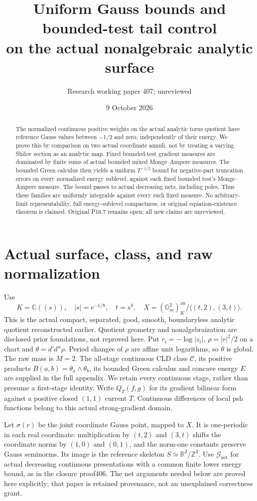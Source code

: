 \documentclass[11pt]{article}
\title{Uniform Gauss bounds and bounded-test tail control\\on the actual nonalgebraic analytic surface}
\author{Research working paper 407; unreviewed}
\date{9 October 2026}
\newcommand{\DD}{d'd''}
\newcommand{\C}{\mathcal C}
\newcommand{\GN}{\mathcal G_{\mathrm{net}}}
\newcommand{\RR}{\mathbb R}
\theoremstyle{remark}\newtheorem{remark}[theorem]{Remark}
\begin{document}
\maketitle
\begin{abstract}
The normalized continuous positive weights on the actual analytic
torus quotient have reference Gauss values between $-1/2$ and zero,
independently of their energy. We prove this by comparison on two
actual coordinate annuli, not by treating a varying Shilov section
as an analytic map. Fixed bounded-test gradient measures are
dominated by finite sums of actual bounded mixed Monge--Ampere
measures. The bounded Green calculus then yields a uniform
$T^{-1/2}$ bound for negative-part truncation errors on every
normalized energy sublevel, against each fixed bounded test's
Monge--Ampere measure. The bound passes to actual decreasing nets,
including poles. Thus these families are uniformly integrable
against every such fixed measure. No arbitrary-limit
representability, full energy-sublevel compactness, or original
equation-existence theorem is claimed. Original P16.7 remains open;
all new claims are unreviewed.
\end{abstract}

\section{Actual surface, class, and raw normalization}
Use
\[
 K=\mathbb C((s)),\quad |s|=e^{-1/8},\quad t=s^8,
 \quad X=(\mathbb G_m^2)^{\mathrm{an}}_K/
              \langle(t,2),(3,t)\rangle.
\]
This is the actual compact, separated, good, smooth, boundaryless
analytic quotient reconstructed earlier. Quotient geometry and
nonalgebraization are disclosed prior foundations, not reproved
here. Put $r_i=-\log|z_i|$, $\rho=|r|^2/2$ on a chart and
$\theta=\DD\rho$. Period changes of $\rho$ are affine unit
logarithms, so $\theta$ is global. The raw mass is $M=2$.
The all-stage continuous CLD class $\C$, its positive products
$B(a,b)=\theta_a\wedge\theta_b$, its bounded Green calculus and
concave energy $E$ are supplied in the full appendix. We retain
every continuous stage, rather than presume a first-stage identity.
Write $Q_T(f,g)$ for its gradient bilinear form against a positive
closed $(1,1)$ current $T$. Continuous differences of local psh
functions belong to this actual strong-gradient domain.

Let $\sigma(r)$ be the joint coordinate Gauss point, mapped to
$X$. It is one-periodic in each real coordinate: multiplication
by $(t,2)$ and $(3,t)$ shifts the coordinate norms by $(1,0)$ and
$(0,1)$, and the norm-one constants preserve Gauss seminorms.
Its image is the reference skeleton $S\simeq\RR^2/\mathbb Z^2$.
Use $\GN$ for actual decreasing continuous presentations with a
common finite lower energy bound, as in the closure proof406.
The net arguments needed below are proved here explicitly; that
paper is retained provenance, not an unexplained correctness grant.
\end{document}
